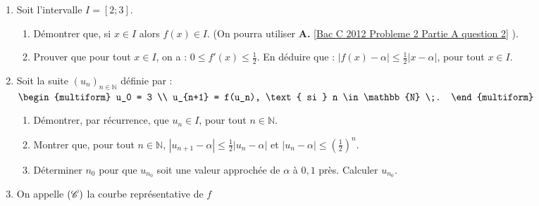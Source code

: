 \begin{description}
\begin{enumerate}
\begin{enumerate}
                              \end{enumerate}
                        \item Soit l'intervalle $I = [2 ; 3]$.
                              \begin{enumerate}
                                    \item D\'emontrer que, si $x \in I$ alors $f(x) \in I$. 
                                          (On pourra utiliser 
                                          \textbf{A.}
                                          \ref{Bac C 2012 Probleme 2 Partie A question 2}
                                          ).
                                    \item Prouver que pour tout $x\in I$, on a : $0 \leq f'(x) \leq \frac{1}{2}$.
                                          En d\'eduire que : $|f(x) - \alpha| \leq \frac{1}{2} |x-\alpha|$, pour tout $x\in I$.
                              \end{enumerate}
                        \item Soit la suite $(u_n)_{n\in\mathbb{N}}$ d\'efinie par : 
                              $
                                    \begin{multiform}
                                          u_0 = 3 \\
                                          u_{n+1} = f(u_n), \text{ si } n \in \mathbb{N} \;.
                                    \end{multiform}
                              $
                              \begin{enumerate}
                                    \item D\'emontrer, par r\'ecurrence, que $u_n \in I$, pour tout $n \in \mathbb{N}$.
                                    \item Montrer que, pour tout $n\in\mathbb{N}$, 
                                          $|u_{n+1} - \alpha| \leq \frac{1}{2} |u_n - \alpha |$ et 
                                          $|u_n - \alpha| \leq \left( \frac{1}{2} \right)^n$.
                                    \item D\'eterminer $n_0$ pour que $u_{n_0}$ soit une 
                                          valeur approch\'ee de $\alpha$ \`a $0,1$ pr\`es. 
                                          Calculer $u_{n_0}$.
                              \end{enumerate}
                        \item On appelle $(\mathscr{C})$ la courbe repr\'esentative de $f$ 

\end{enumerate}
\end{description}

